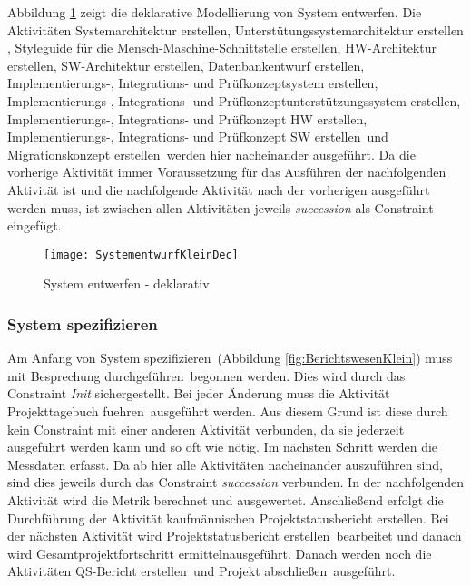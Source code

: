 {Abbildung \ref{fig:SystementwurfKleinDec} zeigt die deklarative Modellierung von \grqq System entwerfen\grqq.\newline
Die Aktivitäten \grqq Systemarchitektur erstellen\grqq,  \grqq Unterstütungssystemarchitektur erstellen \grqq,  \grqq Styleguide für die Mensch-Maschine-Schnittstelle erstellen\grqq,  \grqq HW-Architektur erstellen\grqq,  \grqq SW-Architektur erstellen\grqq,  \grqq Datenbankentwurf erstellen\grqq,  \grqq Implementierungs-, Integrations- und Prüfkonzeptsystem erstellen\grqq,  \grqq Implementierungs-, Integrations- und Prüfkonzeptunterstützungssystem erstellen\grqq,  \grqq Implementierungs-, Integrations- und Prüfkonzept HW erstellen, Implementierungs-, Integrations- und Prüfkonzept SW erstellen\grqq \ und \grqq Migrationskonzept erstellen\grqq \ werden hier nacheinander ausgeführt. Da die vorherige Aktivität immer Voraussetzung für das Ausführen der nachfolgenden Aktivität ist und die nachfolgende Aktivität nach der vorherigen ausgeführt werden muss, ist zwischen allen Aktivitäten jeweils \textit{succession} als Constraint eingefügt.

\begin{figure}[!htbp]
\begin{center}
  \texttt{[image: SystementwurfKleinDec]} %
  \caption{System entwerfen - deklarativ}
  \label{fig:SystementwurfKleinDec}
\end{center}
\end{figure}

\subsubsection{System spezifizieren}


Am Anfang von \grqq System spezifizieren\grqq \ (Abbildung \ref{fig:BerichtswesenKlein}) muss mit \grqq Besprechung durchgeführen\grqq \ begonnen werden. Dies wird durch das Constraint \textit{Init} sichergestellt. Bei jeder Änderung muss die Aktivität \grqq Projekttagebuch fuehren\grqq \ ausgeführt werden. Aus diesem Grund ist diese durch kein Constraint mit einer anderen Aktivität verbunden, da sie jederzeit ausgeführt werden kann und so oft wie nötig.
Im nächsten Schritt werden die \grqq Messdaten erfasst\grqq. Da ab hier alle Aktivitäten nacheinander auszuführen sind, sind dies jeweils durch das Constraint \textit{succession} verbunden.\newline
In der nachfolgenden Aktivität wird die \grqq Metrik berechnet und ausgewertet\grqq.\newline
Anschließend erfolgt die Durchführung der Aktivität \grqq kaufmännischen Projektstatusbericht erstellen\grqq.\newline
Bei der nächsten Aktivität wird \grqq Projektstatusbericht erstellen\grqq \ bearbeitet und danach wird \grqq Gesamtprojektfortschritt ermitteln\grqq ausgeführt.
Danach werden noch die Aktivitäten \grqq QS-Bericht erstellen\grqq \ und \grqq Projekt abschließen\grqq \ ausgeführt.

}
